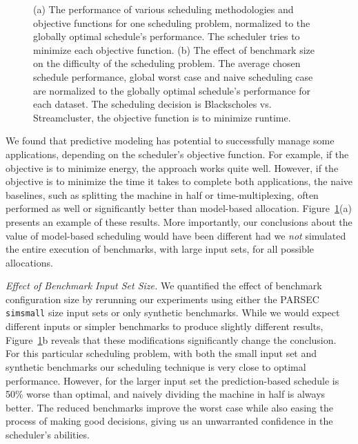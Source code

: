 \begin{figure}[htb]
	\noindent{}
        \caption{\label{fig:case_study_outcome}  (a) The performance
          of various scheduling methodologies and objective functions
          for one scheduling problem, normalized to the globally
          optimal schedule's performance.  The scheduler tries to
          minimize each objective function.  (b) The effect of
          benchmark size on the difficulty of the scheduling problem.
          The average chosen schedule performance, global worst case
          and naive scheduling case are normalized to the globally
          optimal schedule's performance for each dataset. The
          scheduling decision is Blackscholes vs. Streamcluster, the
          objective function is to minimize runtime.
 }
\end{figure}

We found that predictive modeling has potential to successfully manage
some applications, depending on the scheduler's objective function.
For example, if the objective is to minimize energy, the approach
works quite well.  However, if the objective is to minimize the time
it takes to complete both applications, the naive baselines, such as
splitting the machine in half or time-multiplexing, often performed as
well or significantly better than model-based
allocation. Figure~\ref{fig:case_study_outcome}(a) presents an example
of these results. More importantly, our conclusions about the value of
model-based scheduling would have been different had we \emph{not}
simulated the entire execution of benchmarks, with large input sets,
for all possible allocations.

\emph{Effect of Benchmark Input Set Size.}
We quantified the effect of benchmark configuration size by rerunning
our experiments using either the PARSEC {\tt simsmall} size input sets
or only synthetic benchmarks. While we would expect different inputs
or simpler benchmarks to produce slightly different results,
Figure~\ref{fig:case_study_outcome}b reveals that these modifications
significantly change the conclusion.  For this particular scheduling
problem, with both the small input set and synthetic benchmarks our
scheduling technique is very close to optimal performance.  However,
for the larger input set the prediction-based schedule is 50\% worse
than optimal, and naively dividing the machine in half is always
better. The reduced benchmarks improve the worst case while also
easing the process of making good decisions, giving us an unwarranted
confidence in the scheduler's abilities.

